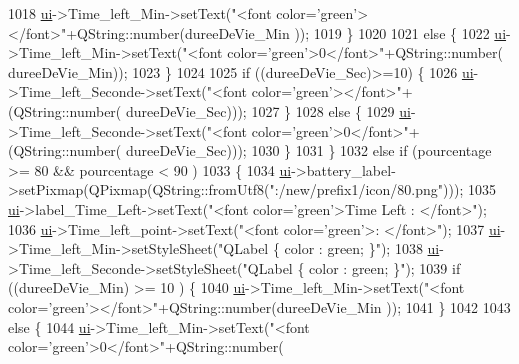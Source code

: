 \begin{DoxyCode}
{1018                   \hyperlink{a00008_a6dc041ef6a2ffb329928d2913e8344e6}{ui}->Time\_left\_Min->setText(\textcolor{stringliteral}{"<font color='green'></font>"}+QString::number(dureeDeVie\_Min
      ));
1019               \}
1020 
1021               \textcolor{keywordflow}{else} \{
1022                   \hyperlink{a00008_a6dc041ef6a2ffb329928d2913e8344e6}{ui}->Time\_left\_Min->setText(\textcolor{stringliteral}{"<font color='green'>0</font>"}+QString::number(
      dureeDeVie\_Min));
1023               \}
1024 
1025               \textcolor{keywordflow}{if} ((dureeDeVie\_Sec)>=10) \{
1026                   \hyperlink{a00008_a6dc041ef6a2ffb329928d2913e8344e6}{ui}->Time\_left\_Seconde->setText(\textcolor{stringliteral}{"<font color='green'></font>"}+(QString::number(
      dureeDeVie\_Sec)));
1027               \}
1028               \textcolor{keywordflow}{else} \{
1029                   \hyperlink{a00008_a6dc041ef6a2ffb329928d2913e8344e6}{ui}->Time\_left\_Seconde->setText(\textcolor{stringliteral}{"<font color='green'>0</font>"}+(QString::number(
      dureeDeVie\_Sec)));
1030               \}
1031          \}
1032           \textcolor{keywordflow}{else} \textcolor{keywordflow}{if} (pourcentage >= 80 && pourcentage < 90 )
1033           \{
1034               \hyperlink{a00008_a6dc041ef6a2ffb329928d2913e8344e6}{ui}->battery\_label->setPixmap(QPixmap(QString::fromUtf8(\textcolor{stringliteral}{":/new/prefix1/icon/80.png"})));
1035               \hyperlink{a00008_a6dc041ef6a2ffb329928d2913e8344e6}{ui}->label\_Time\_Left->setText(\textcolor{stringliteral}{"<font color='green'>Time Left : </font>"});
1036               \hyperlink{a00008_a6dc041ef6a2ffb329928d2913e8344e6}{ui}->Time\_left\_point->setText(\textcolor{stringliteral}{"<font color='green'>: </font>"});
1037               \hyperlink{a00008_a6dc041ef6a2ffb329928d2913e8344e6}{ui}->Time\_left\_Min->setStyleSheet(\textcolor{stringliteral}{"QLabel \{ color : green; \}"});
1038               \hyperlink{a00008_a6dc041ef6a2ffb329928d2913e8344e6}{ui}->Time\_left\_Seconde->setStyleSheet(\textcolor{stringliteral}{"QLabel \{ color : green; \}"});
1039               \textcolor{keywordflow}{if} ((dureeDeVie\_Min) >=  10 ) \{
1040                   \hyperlink{a00008_a6dc041ef6a2ffb329928d2913e8344e6}{ui}->Time\_left\_Min->setText(\textcolor{stringliteral}{"<font color='green'></font>"}+QString::number(dureeDeVie\_Min
      ));
1041               \}
1042 
1043               \textcolor{keywordflow}{else} \{
1044                   \hyperlink{a00008_a6dc041ef6a2ffb329928d2913e8344e6}{ui}->Time\_left\_Min->setText(\textcolor{stringliteral}{"<font color='green'>0</font>"}+QString::number(
}
\end{DoxyCode}

